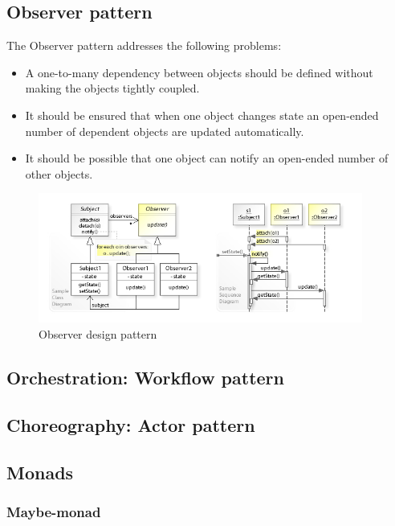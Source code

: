 \subsection{Observer pattern}

The Observer pattern addresses the following problems:
\begin{itemize}
        \item A one-to-many dependency between objects should be defined without making the objects tightly coupled.
        \item It should be ensured that when one object changes state an open-ended number of dependent objects are updated automatically.
        \item It should be possible that one object can notify an open-ended number of other objects.
\end{itemize}

\begin{figure}[h]
\caption{Observer design pattern}
\centering
\includegraphics[width=0.95\textwidth]{images/observerDesignPattern.jpg}
\end{figure}


\subsection{Orchestration: Workflow pattern}

\subsection{Choreography: Actor pattern}

\subsection{Monads}

\subsubsection{Maybe-monad}

